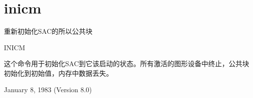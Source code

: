 \section{inicm}
\label{cmd:inicm}

重新初始化SAC的所以公共块

INICM

这个命令用于初始化SAC到它该启动的状态。所有激活的图形设备中终止，公共块初始化到初始值，内存中数据丢失。

January 8, 1983 (Version 8.0)

